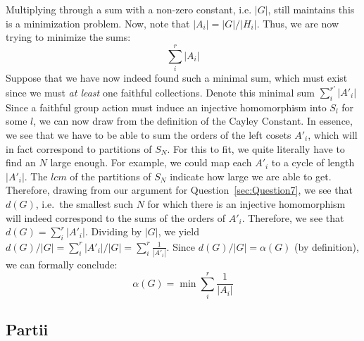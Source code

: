 \documentclass[letterpaper]{article}
\begin{document}
Multiplying through a sum with a non-zero constant, i.e. $ |G| $, still maintains this is a minimization problem.
Now, note that $ |A_i| = |G|/|H_i| $.
Thus, we are now trying to minimize the sums:
\[
\sum_i^{r} |A_i|
\]
Suppose that we have now indeed found such a minimal sum, which must exist since we must \textit{at least} one faithful collections.
Denote this minimal sum $ \sum_{i}^{r'} |A'_i| $
Since a faithful group action must induce an injective homomorphism into $ S_l $ for some $ l $, we can now draw from the definition of the Cayley Constant.
In essence, we see that we have to be able to sum the orders of the left cosets $ A'_i $, which will in fact correspond to partitions of $ S_N $.
For this to fit, we quite literally have to find an $ N $ large enough.
For example, we could map each $ A'_i $ to a cycle of length $ |A'_i| $.
The $ lcm $ of the partitions of $ S_N $ indicate how large we are able to get.
Therefore, drawing from our argument for Question~\ref{sec:Question7}, we see that $ d(G) $, i.e.\ the smallest such $ N $ for which there is an injective homomorphism will indeed correspond to the sums of the orders of $ A'_i $.
Therefore, we see that $ d(G) = \sum_i^{r} |A'_i| $.
Dividing by $ |G| $, we yield $ d(G) / |G| = \sum_i^{r} |A'_i| / |G| = \sum_i^{r} \frac{1}{|A'_i|} $.
Since $ d(G) / |G| = \alpha(G) $ (by definition), we can formally conclude:
\[
\alpha(G) = \min{\sum_i^{r} \frac{1}{|A_i|}}
\]

\subsection{Partii}
\label{sub:8Partii}
\end{document}
